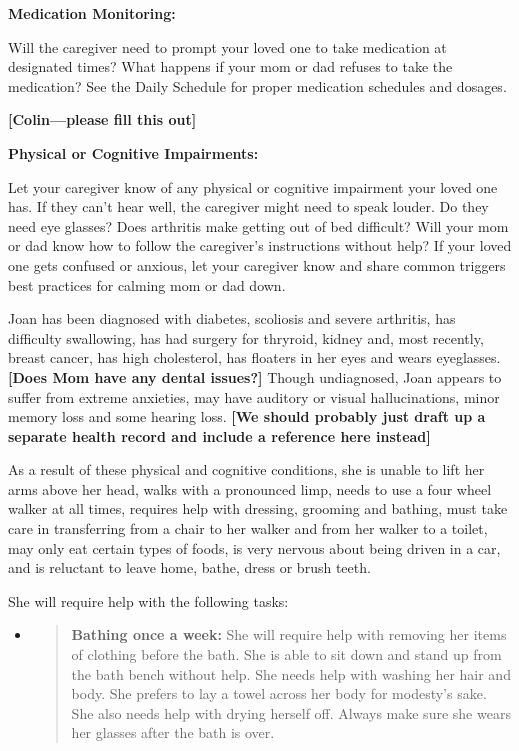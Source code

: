 \documentclass[]{article}
\begin{document}
\textbf{Medication Monitoring:}

Will the caregiver need to prompt your loved one to take medication at
designated times? What happens if your mom or dad refuses to take the
medication? See the Daily Schedule for proper medication schedules and
dosages.

\textbf{{[}Colin---please fill this out{]}}

\textbf{Physical or Cognitive Impairments:}

Let your caregiver know of any physical or cognitive impairment your
loved one has. If they can't hear well, the caregiver might need to
speak louder. Do they need eye glasses? Does arthritis make getting out
of bed difficult? Will your mom or dad know how to follow the
caregiver's instructions without help? If your loved one gets confused
or anxious, let your caregiver know and share common triggers best
practices for calming mom or dad down.

Joan has been diagnosed with diabetes, scoliosis and severe arthritis,
has difficulty swallowing, has had surgery for thryroid, kidney and,
most recently, breast cancer, has high cholesterol, has floaters in her
eyes and wears eyeglasses. \textbf{{[}Does Mom have any dental
issues?{]}} Though undiagnosed, Joan appears to suffer from extreme
anxieties, may have auditory or visual hallucinations, minor memory loss
and some hearing loss. \textbf{{[}We should probably just draft up a
separate health record and include a reference here instead{]}}

As a result of these physical and cognitive conditions, she is unable to
lift her arms above her head, walks with a pronounced limp, needs to use
a four wheel walker at all times, requires help with dressing, grooming
and bathing, must take care in transferring from a chair to her walker
and from her walker to a toilet, may only eat certain types of foods, is
very nervous about being driven in a car, and is reluctant to leave
home, bathe, dress or brush teeth.

She will require help with the following tasks:

\begin{itemize}
\item
  \begin{quote}
  \textbf{Bathing once a week:} She will require help with removing her
  items of clothing before the bath. She is able to sit down and stand
  up from the bath bench without help. She needs help with washing her
  hair and body. She prefers to lay a towel across her body for
  modesty's sake. She also needs help with drying herself off. Always
  make sure she wears her glasses after the bath is over.
  \end{quote}
\end{itemize}
\end{document}
